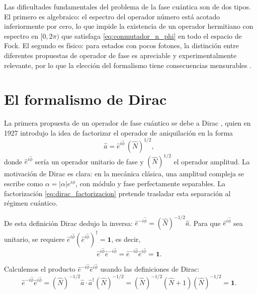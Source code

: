         Las dificultades fundamentales del problema de la fase cuántica son de dos tipos. El primero es algebraico: el espectro del operador número está acotado inferiormente por cero, lo que impide la existencia de un operador hermitiano con espectro en $[0, 2\pi)$ que satisfaga \eqref{eq:conmutador_n_phi} en todo el espacio de Fock. El segundo es físico: para estados con pocos fotones, la distinción entre diferentes propuestas de operador de fase es apreciable y experimentalmente relevante, por lo que la elección del formalismo tiene consecuencias mensurables \cite{Mandel1995}.
 
    \section{El formalismo de Dirac}
    
        La primera propuesta de un operador de fase cuántico se debe a Dirac \cite{Dirac1927}, quien en 1927 introdujo la idea de factorizar el operador de aniquilación en la forma
        \begin{equation}
            \hat{a} = \hat{e}^{i\hat{\phi}} \, (\hat{N})^{1/2},
            \label{eq:dirac_factorizacion}
        \end{equation}
        donde $\hat{e}^{i\hat{\phi}}$ sería un operador unitario de fase y $(\hat{N})^{1/2}$ el operador amplitud. La motivación de Dirac es clara: en la mecánica clásica, una amplitud compleja se escribe como $\alpha = |\alpha| e^{i\phi}$, con módulo y fase perfectamente separables. La factorización \eqref{eq:dirac_factorizacion} pretende trasladar esta separación al régimen cuántico.
        
        De esta definición Dirac dedujo la inversa: $\hat{e}^{-i\hat{\phi}} = (\hat{N})^{-1/2} \hat{a}$. Para que $\hat{e}^{i\hat{\phi}}$ sea unitario, se requiere $\hat{e}^{i\hat{\phi}} (\hat{e}^{i\hat{\phi}})^\dagger = \mathbf{1}$, es decir,
        \begin{equation}
            \hat{e}^{i\hat{\phi}} \hat{e}^{-i\hat{\phi}} = \hat{e}^{-i\hat{\phi}} \hat{e}^{i\hat{\phi}} = \mathbf{1}.
            \label{eq:unitariedad}
        \end{equation}
        
        Calculemos el producto $\hat{e}^{-i\hat{\phi}} \hat{e}^{i\hat{\phi}}$ usando las definiciones de Dirac:
        \begin{equation}
            \hat{e}^{-i\hat{\phi}} \hat{e}^{i\hat{\phi}} = (\hat{N})^{-1/2} \hat{a} \cdot \hat{a}^{\dagger} (\hat{N})^{-1/2} = (\hat{N})^{-1/2} (\hat{N} + 1) (\hat{N})^{-1/2} = \mathbf{1}.
            \label{eq:producto1}
        \end{equation}
        
